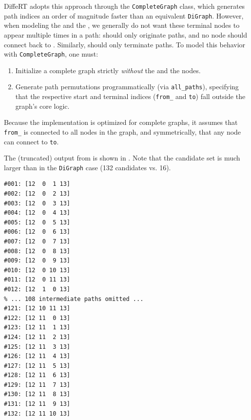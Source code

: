 DiffeRT adopts this approach through the \texttt{CompleteGraph} class, which generates path indices an order of magnitude faster than an equivalent \texttt{DiGraph}. However, when modeling the  and the , we generally do not want these terminal nodes to appear multiple times in a path:  should only originate paths, and no node should connect back to . Similarly,  should only terminate paths. To model this behavior with \texttt{CompleteGraph}, one must:
\begin{enumerate}
  \item Initialize a complete graph strictly \emph{without} the  and the  nodes.
  \item Generate path permutations programmatically (via \texttt{all\_paths}), specifying that the respective start and terminal indices (\texttt{from\_} and \texttt{to}) fall outside the graph's core logic.
\end{enumerate}
Because the implementation is optimized for complete graphs, it assumes that \texttt{from\_} is connected to all nodes in the graph, and symmetrically, that any node can connect to \texttt{to}.

\begin{listing}[htpb]
  \caption{Generating paths using \texttt{CompleteGraph} under unknown visibility assumptions.}
\end{listing}

The (truncated) output from  is shown in . Note that the candidate set is much larger than in the \texttt{DiGraph} case (132 candidates vs. 16).

\begin{listing}[htpb]
  \caption{Output from .}
\begin{verbatim}
#001: [12  0  1 13]
#002: [12  0  2 13]
#003: [12  0  3 13]
#004: [12  0  4 13]
#005: [12  0  5 13]
#006: [12  0  6 13]
#007: [12  0  7 13]
#008: [12  0  8 13]
#009: [12  0  9 13]
#010: [12  0 10 13]
#011: [12  0 11 13]
#012: [12  1  0 13]
% ... 108 intermediate paths omitted ...
#121: [12 10 11 13]
#122: [12 11  0 13]
#123: [12 11  1 13]
#124: [12 11  2 13]
#125: [12 11  3 13]
#126: [12 11  4 13]
#127: [12 11  5 13]
#128: [12 11  6 13]
#129: [12 11  7 13]
#130: [12 11  8 13]
#131: [12 11  9 13]
#132: [12 11 10 13]
\end{verbatim}
\end{listing}

